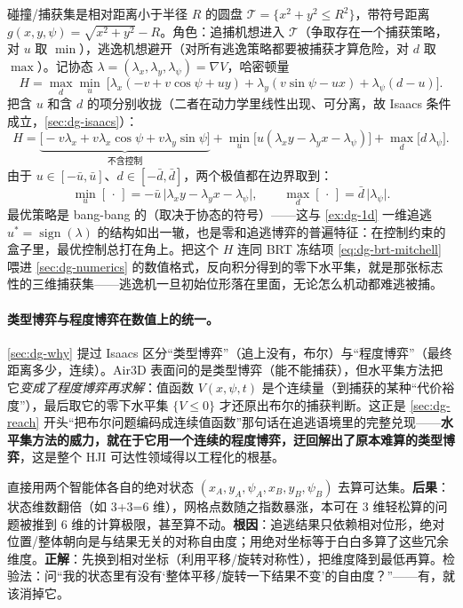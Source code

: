 \begin{example}
\label{ex:dg-air3d-ham}
碰撞/捕获集是相对距离小于半径 $R$ 的圆盘 $\mathcal{T}=\{x^2+y^2\le R^2\}$，带符号距离 $g(x,y,\psi)=\sqrt{x^2+y^2}-R$。角色：追捕机想进入 $\mathcal{T}$（争取存在一个捕获策略，对 $u$ 取 $\min$），逃逸机想避开（对所有逃逸策略都要被捕获才算危险，对 $d$ 取 $\max$）。记协态 $\lambda=(\lambda_x,\lambda_y,\lambda_\psi)=\nabla V$，哈密顿量
\[
  H=\max_{d}\min_{u}\ \Big[\lambda_x(-v+v\cos\psi+u y)+\lambda_y(v\sin\psi-u x)+\lambda_\psi(d-u)\Big].
\]
把含 $u$ 和含 $d$ 的项分别收拢（二者在动力学里线性出现、可分离，故 Isaacs 条件成立，\cref{sec:dg-isaacs}）：
\[
  H=\underbrace{\big[-v\lambda_x+v\lambda_x\cos\psi+v\lambda_y\sin\psi\big]}_{\text{不含控制}}+\min_{u}\big[u(\lambda_x y-\lambda_y x-\lambda_\psi)\big]+\max_{d}\big[d\,\lambda_\psi\big].
\]
由于 $u\in[-\bar u,\bar u]$、$d\in[-\bar d,\bar d]$，两个极值都在边界取到：
\[
  \min_u[\,\cdot\,]=-\bar u\,\lvert\lambda_x y-\lambda_y x-\lambda_\psi\rvert,\qquad \max_d[\,\cdot\,]=\bar d\,\lvert\lambda_\psi\rvert.
\]
最优策略是 bang-bang 的（取决于协态的符号）——这与 \cref{ex:dg-1d} 一维追逃 $u^*=\operatorname{sign}(\lambda)$ 的结构如出一辙，也是零和追逃博弈的普遍特征：在控制约束的盒子里，最优控制总打在角上。把这个 $H$ 连同 BRT 冻结项 \cref{eq:dg-brt-mitchell} 喂进 \cref{sec:dg-numerics} 的数值格式，反向积分得到的零下水平集，就是那张标志性的三维捕获集——逃逸机一旦初始位形落在里面，无论怎么机动都难逃被捕。
\end{example}

\paragraph{类型博弈与程度博弈在数值上的统一。}
\cref{sec:dg-why} 提过 Isaacs 区分“类型博弈”（追上没有，布尔）与“程度博弈”（最终距离多少，连续）。Air3D 表面问的是类型博弈（能不能捕获），但水平集方法把它\emph{变成了程度博弈再求解}：值函数 $V(x,\psi,t)$ 是个连续量（到捕获的某种“代价裕度”），最后取它的零下水平集 $\{V\le0\}$ 才还原出布尔的捕获判断。这正是 \cref{sec:dg-reach} 开头“把布尔问题编码成连续值函数”那句话在追逃语境里的完整兑现——\textbf{水平集方法的威力，就在于它用一个连续的程度博弈，迂回解出了原本难算的类型博弈}，这是整个 HJI 可达性领域得以工程化的根基。

\begin{pitfall}
直接用两个智能体各自的绝对状态 $(x_A,y_A,\psi_A,x_B,y_B,\psi_B)$ 去算可达集。\textbf{后果}：状态维数翻倍（如 3+3=6 维），网格点数随之指数暴涨，本可在 3 维轻松算的问题被推到 6 维的计算极限，甚至算不动。\textbf{根因}：追逃结果只依赖相对位形，绝对位置/整体朝向是与结果无关的对称自由度；用绝对坐标等于白白多算了这些冗余维度。\textbf{正解}：先换到相对坐标（利用平移/旋转对称性），把维度降到最低再算。检验法：问“我的状态里有没有‘整体平移/旋转一下结果不变’的自由度？”——有，就该消掉它。
\end{pitfall}

